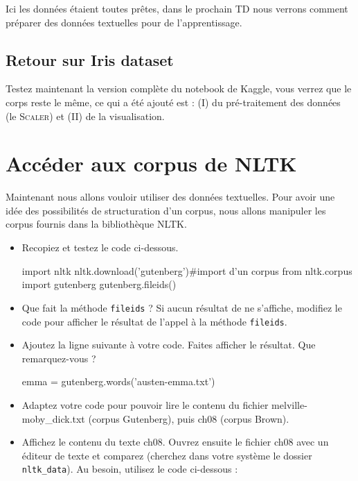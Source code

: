 Ici les données étaient toutes prêtes, dans le prochain TD nous verrons comment préparer des données textuelles pour de l'apprentissage.

\subsection{Retour sur Iris dataset}

Testez maintenant la version complète du notebook de Kaggle, vous verrez que le corps reste le même, ce qui a été ajouté est : (I) du pré-traitement des données (le \textsc{Scaler}) et (II) de la visualisation.




\section{Accéder aux corpus de NLTK}

Maintenant nous allons vouloir utiliser des données textuelles. Pour avoir une idée des possibilités de structuration d'un corpus, nous allons manipuler les corpus fournis dans la bibliothèque NLTK.

\begin{itemize}
  \item Recopiez et testez le code ci-dessous.
\begin{python}
import nltk
nltk.download('gutenberg')#import d'un corpus
from nltk.corpus import gutenberg 
gutenberg.fileids()
\end{python}

  \item Que fait la méthode \texttt{fileids} ? Si aucun résultat de ne s'affiche, modifiez le code pour afficher le résultat de l'appel à la méthode \texttt{fileids}.

\item Ajoutez la ligne suivante à votre code. Faites afficher le résultat. Que remarquez-vous ?

\begin{python}
emma = gutenberg.words('austen-emma.txt')
\end{python}
  \item Adaptez votre code pour pouvoir lire le contenu du fichier melville-moby\_dick.txt (corpus Gutenberg), puis ch08 (corpus Brown).
  \item  Affichez le contenu du texte ch08. Ouvrez ensuite le fichier ch08 avec un éditeur de texte et comparez (cherchez dans votre système le dossier \texttt{nltk\_data}). Au besoin, utilisez le code ci-dessous :
\end{itemize}

